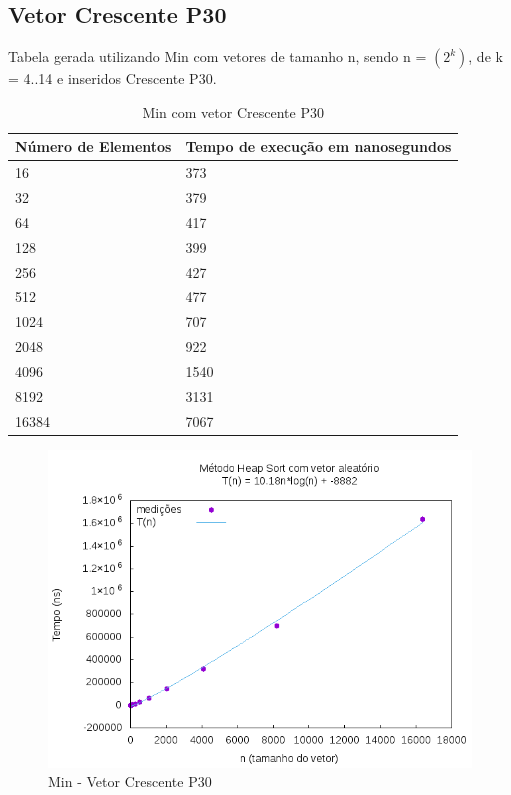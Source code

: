 \documentclass[12pt,a4paper,twoside]{report}
\begin{document}
\subsection{Vetor Crescente P30}
Tabela gerada utilizando Min com vetores de tamanho n, sendo n = $(2^k)$, de k = 4..14 e inseridos Crescente P30.
\begin{table}[H]
\centering
\caption{Min com vetor Crescente P30}
\label{my-label}
\begin{tabular}{|l|l|}
\hline
\multicolumn{1}{|c|}{\textbf{Número de Elementos}} & \multicolumn{1}{c|}{\textbf{Tempo de execução em nanosegundos}} \\ \hline
16 & 373 \\ \hline
32 & 379 \\ \hline
64 & 417 \\ \hline
128 & 399 \\ \hline
256 & 427 \\ \hline
512 & 477 \\ \hline
1024 & 707 \\ \hline
2048 & 922 \\ \hline
4096 & 1540 \\ \hline
8192 & 3131 \\ \hline
16384 & 7067 \\ \hline
\end{tabular}
\end{table}

\begin{figure}[H]
    \centering
    \includegraphics[width=0.7\linewidth]{graficos/HeapSort/vIntAleatorio/vIntAleatorio.png}
  \caption{Min - Vetor Crescente P30}
\end{figure}
\end{document}
